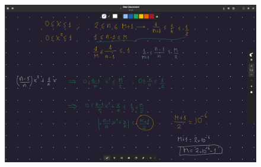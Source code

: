 \begin{frame}
	\begin{solution}
		\begin{figure}[ht!]
			\centering
			\includegraphics[width=.9\paperwidth]{4}
		\end{figure}
	\end{solution}
\end{frame}
